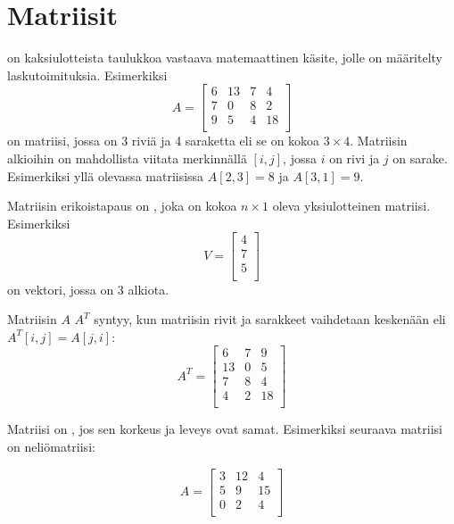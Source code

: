\chapter{Matriisit}


 on kaksiulotteista taulukkoa
vastaava matemaattinen käsite,
jolle on määritelty laskutoimituksia.
Esimerkiksi
\[
A = 
 \begin{bmatrix}
  6 & 13 & 7 & 4 \\
  7 & 0 & 8 & 2 \\
  9 & 5 & 4 & 18 \\
 \end{bmatrix}
\]
on matriisi, jossa on 3 riviä ja 4 saraketta
eli se on kokoa $3 \times 4$.
Matriisin alkioihin on mahdollista
viitata merkinnällä $[i,j]$,
jossa $i$ on rivi ja $j$ on sarake.
Esimerkiksi yllä olevassa matriisissa
$A[2,3]=8$ ja $A[3,1]=9$.


Matriisin erikoistapaus on ,
joka on kokoa $n \times 1$ oleva yksiulotteinen matriisi.
Esimerkiksi
\[
V =
\begin{bmatrix}
4 \\
7 \\
5 \\
\end{bmatrix}
\]
on vektori, jossa on 3 alkiota.


Matriisin $A$  $A^T$ syntyy,
kun matriisin rivit ja sarakkeet vaihdetaan
keskenään eli $A^T[i,j]=A[j,i]$:
\[
A^T = 
 \begin{bmatrix}
  6 & 7 & 9 \\
  13 & 0 & 5 \\
  7 & 8 & 4 \\
  4 & 2 & 18 \\
 \end{bmatrix}
\]


Matriisi on , jos sen
korkeus ja leveys ovat samat.
Esimerkiksi seuraava matriisi on neliömatriisi:

\[
A = 
 \begin{bmatrix}
  3 & 12 & 4  \\
  5 & 9 & 15  \\
  0 & 2 & 4 \\
 \end{bmatrix}
\]


